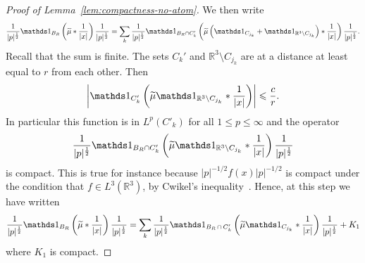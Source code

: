 \documentclass[10pt]{amsart}
\theoremstyle{definition}
\newcommand{\R}{\mathbb{R}}
\newcommand\1{{\ensuremath {\mathds 1} }}
\newcommand{\ii}{\infty}
\renewcommand{\leq}{\leqslant}
\renewcommand{\tilde}{\widetilde}
\let\oldtilde\tilde
\renewcommand*{\tilde}[1]{\mathchoice{\widetilde{#1}}{\widetilde{#1}}{\oldtilde{#1}}{\oldtilde{#1}}}
\begin{document}
\begin{proof}[Proof of Lemma~\ref{lem:compactness-no-atom}]
We then write
\[
\frac1{|p|^{\frac12}}\1_{B_R}\left(\tilde\mu\ast\frac1{|x|}\right)\frac1{|p|^{\frac12}}=\sum_{k}\frac1{|p|^{\frac12}}\1_{B_R\cap C'_k}\left(\tilde\mu\left(\1_{C_{j_k}}+\1_{\R^3\setminus C_{j_k}}\right)\ast\frac1{|x|}\right)\frac1{|p|^{\frac12}}.
\]
Recall that the sum is finite. The sets $C_k'$ and $\R^3\setminus C_{j_k}$ are at a distance at least equal to $r$ from each other. Then
\[
\left|\1_{C'_k}\left(\tilde\mu\1_{\R^3\setminus C_{j_k}}\ast\frac1{|x|}\right)\right|\leq\frac{c}{r}.
\]
In particular this function is in $L^p(C'_k)$ for all $1\leq p\leq\ii$ and the operator
\[
\frac1{|p|^{\frac12}}\1_{B_R\cap C'_k}\left(\tilde\mu\1_{\R^3\setminus C_{j_k}}\ast\frac1{|x|}\right)\frac1{|p|^{\frac12}}
\]
is compact. This is true for instance because $|p|^{-1/2}f(x)|p|^{-1/2}$ is compact under the condition that $f\in L^3(\R^3)$, by Cwikel's inequality~\cite{Simon-79}. Hence, at this step we have written
\[
\frac1{|p|^{\frac12}}\1_{B_R}\left(\tilde\mu\ast\frac1{|x|}\right)\frac1{|p|^{\frac12}}=\sum_{k}\frac1{|p|^{\frac12}}\1_{B_R\,\cap\,C'_{k}}\left(\tilde\mu\1_{C_{j_k}}\ast\frac1{|x|}\right)\frac1{|p|^{\frac12}}+K_1
\]
where $K_1$ is compact.


\end{proof}
\end{document}
